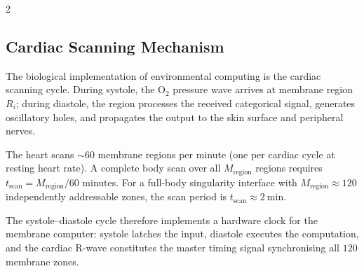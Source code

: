 \begin{multicols}{2}
\subsection{Cardiac Scanning Mechanism}

The biological implementation of environmental computing is the cardiac scanning cycle. During systole, the O$_2$ pressure wave arrives at membrane region $R_i$; during diastole, the region processes the received categorical signal, generates oscillatory holes, and propagates the output to the skin surface and peripheral nerves.

\begin{definition}
\label{def:cardiac_scan}
The heart scans $\sim 60$ membrane regions per minute (one per cardiac cycle at resting heart rate). A complete body scan over all $M_{\mathrm{region}}$ regions requires $t_{\mathrm{scan}} = M_{\mathrm{region}} / 60$ minutes. For a full-body singularity interface with $M_{\mathrm{region}} \approx 120$ independently addressable zones, the scan period is $t_{\mathrm{scan}} \approx 2\ \mathrm{min}$.
\end{definition}

The systole--diastole cycle therefore implements a hardware clock for the membrane computer: systole latches the input, diastole executes the computation, and the cardiac R-wave constitutes the master timing signal synchronising all $120$ membrane zones.

\end{multicols}

